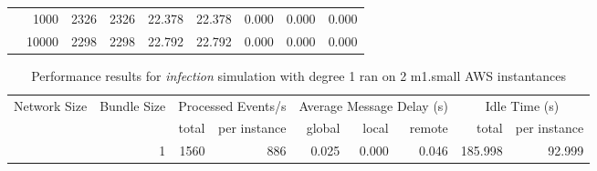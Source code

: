 \begin{table}
\begin{tabular}{rrrrrrrrr}
	            
					 &  
					 
					\multirow{ 1 }{*}{ 1000 } &
					
						
							    
							     2326  & 2326  
	                           & 22.378 & 22.378 & 0.000
	                           & 0.000 & 0.000  \\
	                
	            
					 &  
					 
					\multirow{ 1 }{*}{ 10000 } &
					
						
							    
							     2298  & 2298  
	                           & 22.792 & 22.792 & 0.000
	                           & 0.000 & 0.000  \\
	                
	            
	        

\hline

\end{tabular}
\end{table}
\clearpage


	    
	
	    

\begin{table}
	  \caption[Performance results, \emph{infection:1 on 2 m1.small instances }]{ Performance results for \emph{ infection } simulation with degree 1 ran on 2 m1.small AWS instantances }
	\begin{tabular}{rrrrrrrrr}
	\hline\noalign{\smallskip}

	Network Size &
	Bundle Size &
	\multicolumn{2}{c}{Processed Events/s} & 
	\multicolumn{3}{c}{Average Message Delay (s)} & 
	\multicolumn{2}{c}{Idle Time (s)}  \\

	 & 
	 & 
	 total & per instance
     & global & local & remote
     & total & per instance\\

			
				\noalign{\smallskip}\hline
				\multirow{ 1 }{*}{ 10000 } &
				
					
					 
					\multirow{ 1 }{*}{ 1 } &
					
						
							    
							     1560  & 886  
	                           & 0.025 & 0.000 & 0.046
	                           & 185.998 & 92.999  \\
	                
	            
	        

\hline

\end{tabular}
\end{table}
\clearpage



